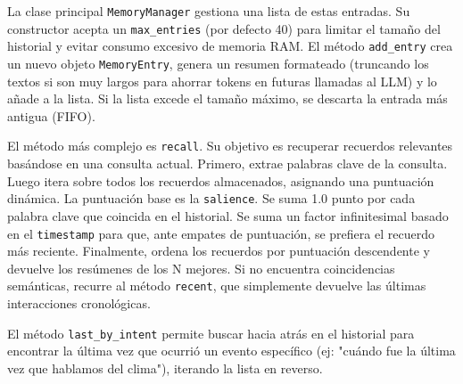 \documentclass[letterpaper,12pt]{article}
\begin{document}
La clase principal \texttt{MemoryManager} gestiona una lista de estas entradas. Su constructor acepta un \texttt{max\_entries} (por defecto 40) para limitar el tamaño del historial y evitar consumo excesivo de memoria RAM.
El método \texttt{add\_entry} crea un nuevo objeto \texttt{MemoryEntry}, genera un resumen formateado (truncando los textos si son muy largos para ahorrar tokens en futuras llamadas al LLM) y lo añade a la lista. Si la lista excede el tamaño máximo, se descarta la entrada más antigua (FIFO).

El método más complejo es \texttt{recall}. Su objetivo es recuperar recuerdos relevantes basándose en una consulta actual. Primero, extrae palabras clave de la consulta. Luego itera sobre todos los recuerdos almacenados, asignando una puntuación dinámica. La puntuación base es la \texttt{salience}. Se suma 1.0 punto por cada palabra clave que coincida en el historial. Se suma un factor infinitesimal basado en el \texttt{timestamp} para que, ante empates de puntuación, se prefiera el recuerdo más reciente. Finalmente, ordena los recuerdos por puntuación descendente y devuelve los resúmenes de los N mejores. Si no encuentra coincidencias semánticas, recurre al método \texttt{recent}, que simplemente devuelve las últimas interacciones cronológicas.

El método \texttt{last\_by\_intent} permite buscar hacia atrás en el historial para encontrar la última vez que ocurrió un evento específico (ej: "cuándo fue la última vez que hablamos del clima"), iterando la lista en reverso.
\end{document}
